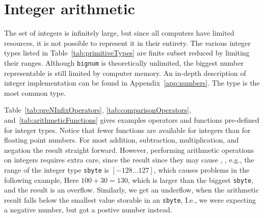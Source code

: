 \section{Integer arithmetic}
The set of integers is infinitely large, but since all computers have limited resources, it is not possible to represent it in their entirety. The various integer types listed in Table~\ref{tab:primitiveTypes} are finite subset reduced by limiting their ranges. Although \lstinline!bignum! is theoretically unlimited, the biggest number representable is still limited by computer memory. An in-depth description of integer implementation can be found in Appendix~\ref{app:numbers}. The type  is the most common type. 

Table~\ref{tab:preNInfixOperators}, \ref{tab:comparisonOperators}, and~\ref{tab:arithmeticFunctions} gives examples operators and functions pre-defined for integer types. Notice that fewer functions are available for integers than for floating point numbers. For most addition, subtraction, multiplication, and negation the result straight forward. However, performing arithmetic operations on integers requires extra care, since the result since they may cause , , e.g., the range of the integer type \lstinline|sbyte| is $[-128\ldots 127]$, which causes problems in the following example,
%
%
%
Here $100+30=130$, which is larger than the biggest \lstinline|sbyte|, and the result is an overflow. Similarly, we get an underflow, when the arithmetic result falls below the smallest value storable in an \lstinline|sbyte|,
%
%
%
I.e., we were expecting a negative number, but got a postive number instead.
%


